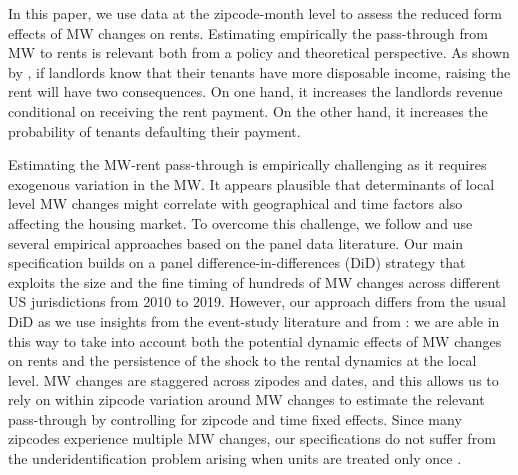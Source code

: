 In this paper, we use data at the zipcode-month level to assess the reduced form effects of 
MW changes on rents. Estimating empirically the pass-through from MW to rents is relevant both 
from a policy and theoretical perspective. As shown by \textcite{agarwal2019minimum}, if landlords 
know that their tenants have more disposable income, raising the rent will have two consequences. 
On one hand, it increases the landlords revenue conditional on receiving the rent payment. On the 
other hand, it increases the probability of tenants defaulting their payment.

Estimating the MW-rent pass-through is empirically challenging as it requires exogenous variation 
in the MW. It appears plausible that determinants of local level MW changes might correlate with 
geographical and time factors also affecting the housing market. To overcome this challenge, we 
follow \textcite{meer2016effects} and use several empirical approaches based on the panel data 
literature. Our main specification builds on a panel difference-in-differences (DiD) strategy 
that exploits the size and the fine timing of hundreds of MW changes across different US jurisdictions 
from 2010 to 2019. However, our approach differs from the usual DiD as we use insights from the 
event-study literature and from \textcite{arellano1991some}: we are able in this way to take into 
account both the potential dynamic effects of MW changes on rents and the persistence of the shock 
to the rental dynamics at the local level. MW changes are staggered across zipodes and dates, and 
this allows us to rely on within zipcode variation around MW changes to estimate the relevant pass-through by controlling for zipcode and time fixed effects. Since many zipcodes experience 
multiple MW changes, our specifications do not suffer from the underidentification problem arising 
when units are treated only once \parencite{BorusyakJaravel2017}.

